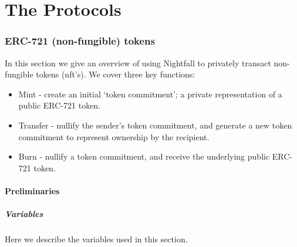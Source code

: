 \documentclass{article}
\begin{document}
\newpage


\part{The Protocols}
\label{part:theProtocols}
\parttoc

\newpage
\section{ERC-721 (non-fungible) tokens}
\label{sec:721}
\secttoc
\mtcskip
\sectlof

\noindent
In this section we give an overview of using Nightfall to privately transact non-fungible tokens (nft's). We cover three key functions:
\begin{itemize}
  \item Mint - create an initial `token commitment'; a private representation of a public ERC-721 token.
  \item Transfer - nullify the sender's token commitment, and generate a new token commitment to represent ownership by the recipient.
  \item Burn - nullify a token commitment, and receive the underlying public ERC-721 token.
\end{itemize}

\subsection{Preliminaries}
\label{sec:721Preliminaries}



\newpage
\subsubsection{Variables}
Here we describe the variables used in this section.
\end{document}
